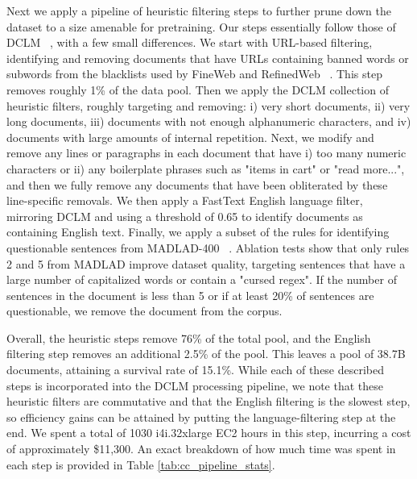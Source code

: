 \documentclass[table]{ai2style/ai2}
\begin{document}
{{Next we apply a pipeline of heuristic filtering steps to further prune down the dataset to a size amenable for pretraining. Our steps essentially follow those of DCLM ~\citep{dclm}, with a few small differences. We start with URL-based filtering, identifying and removing documents that have URLs containing banned words or subwords from the blacklists used by FineWeb \citep{penedo2024fineweb} and RefinedWeb ~\citep{penedo2023refinedwebdatasetfalconllm}. This step removes roughly 1\% of the data pool. Then we apply the DCLM collection of heuristic filters, roughly targeting and removing: i) very short documents, ii) very long documents, iii) documents with not enough alphanumeric characters, and iv) documents with large amounts of internal repetition. Next, we modify and remove any lines or paragraphs in each document that have i) too many numeric characters or ii) any boilerplate phrases such as "items in cart" or "read more...", and then we fully remove any documents that have been obliterated by these line-specific removals. We then apply a FastText English language filter, mirroring DCLM and using a threshold of 0.65 to identify documents as containing English text. Finally, we apply a subset of the rules for identifying questionable sentences from MADLAD-400 ~\citep{kudugunta2023madlad400multilingualdocumentlevellarge}. Ablation tests show that only rules 2 and 5 from MADLAD improve dataset quality, targeting sentences that have a large number of capitalized words or contain a "cursed regex". If the number of sentences in the document is less than 5 or if at least 20\% of sentences are questionable, we remove the document from the corpus.

Overall, the heuristic steps remove 76\% of the total pool, and the English filtering step removes an additional 2.5\% of the pool. This leaves a pool of 38.7B documents, attaining a survival rate of 15.1\%. While each of these described steps is incorporated into the DCLM processing pipeline, we note that these heuristic filters are commutative and that the English filtering is the slowest step, so efficiency gains can be attained by putting the language-filtering step at the end. We spent a total of 1030 i4i.32xlarge EC2 hours in this step, incurring a cost of approximately \$11,300. An exact breakdown of how much time was spent in each step is provided in Table \ref{tab:cc_pipeline_stats}.

}}
\end{document}
